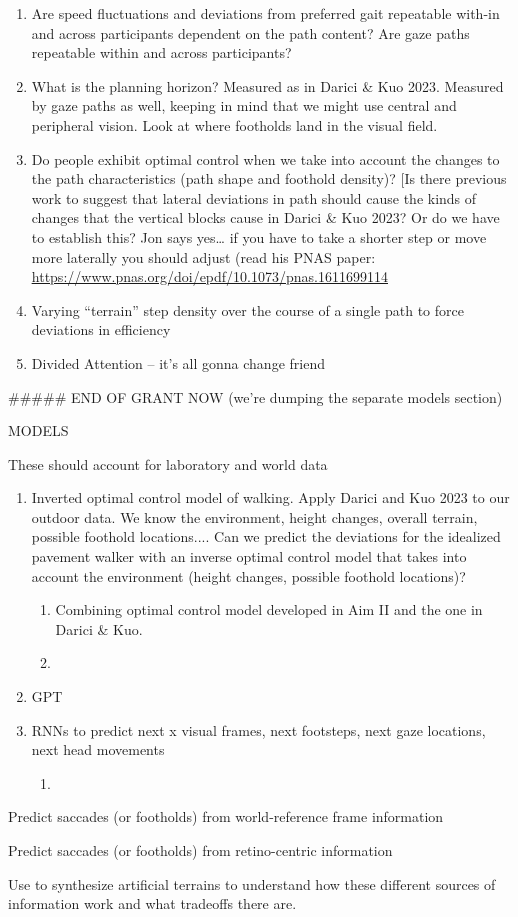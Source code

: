 \documentclass[
]{article}
\providecommand{\tightlist}{%
  \setlength{\itemsep}{0pt}\setlength{\parskip}{0pt}}
\begin{document}
\begin{enumerate}
\def\labelenumi{\Alph{enumi}.}
\item
  Are speed fluctuations and deviations from preferred gait repeatable
  with-in and across participants dependent on the path content? Are
  gaze paths repeatable within and across participants?
\item
  What is the planning horizon? Measured as in Darici \& Kuo 2023.
  Measured by gaze paths as well, keeping in mind that we might use
  central and peripheral vision. Look at where footholds land in the
  visual field.
\item
  Do people exhibit optimal control when we take into account the
  changes to the path characteristics (path shape and foothold density)?
  {[}Is there previous work to suggest that lateral deviations in path
  should cause the kinds of changes that the vertical blocks cause in
  Darici \& Kuo 2023? Or do we have to establish this? Jon says
  yes\ldots{} if you have to take a shorter step or move more laterally
  you should adjust (read his PNAS paper:
  \href{https://www.pnas.org/doi/epdf/10.1073/pnas.1611699114}{\ul{https://www.pnas.org/doi/epdf/10.1073/pnas.1611699114}}
\item
  Varying ``terrain'' step density over the course of a single path to
  force deviations in efficiency
\item
  Divided Attention -- it's all gonna change friend
\end{enumerate}

\#\#\#\#\# END OF GRANT NOW (we're dumping the separate models section)

MODELS

These should account for laboratory and world data

\begin{enumerate}
\def\labelenumi{\Alph{enumi}.}
\item
  Inverted optimal control model of walking. Apply Darici and Kuo 2023
  to our outdoor data. We know the environment, height changes, overall
  terrain, possible foothold locations.... Can we predict the deviations
  for the idealized pavement walker with an inverse optimal control
  model that takes into account the environment (height changes,
  possible foothold locations)?

  \begin{enumerate}
  \def\labelenumii{\alph{enumii}.}
  \item
    Combining optimal control model developed in Aim II and the one in
    Darici \& Kuo.
  \item
  \end{enumerate}
\item
  GPT
\item
  RNNs to predict next x visual frames, next footsteps, next gaze
  locations, next head movements

  \begin{enumerate}
  \def\labelenumii{\alph{enumii}.}
  \tightlist
  \item
  \end{enumerate}
\end{enumerate}

Predict saccades (or footholds) from world-reference frame information

Predict saccades (or footholds) from retino-centric information

Use to synthesize artificial terrains to understand how these different
sources of information work and what tradeoffs there are.
\end{document}

